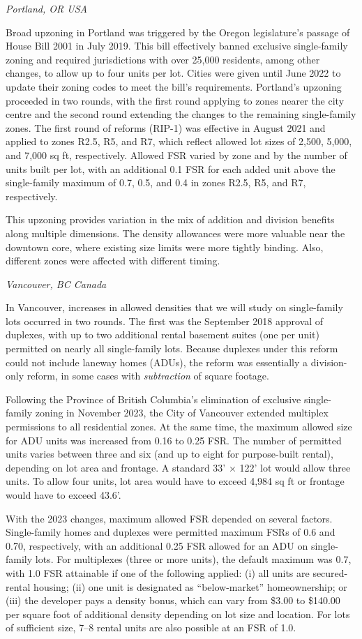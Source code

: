 \documentclass[12pt]{article}
\begin{document}
\textit{Portland, OR USA}

Broad upzoning in Portland was triggered by the Oregon legislature’s passage of
House Bill 2001 in July 2019. This bill effectively banned exclusive
single-family zoning and required jurisdictions with over 25,000 residents,
among other changes, to allow up to four units per lot. Cities were given until
June 2022 to update their zoning codes to meet the bill’s requirements.
Portland's upzoning proceeded in two rounds, with the first round applying to
zones nearer the city centre and the second round extending the changes to the
remaining single-family zones. The first round of reforms (RIP-1) was effective
in August 2021 and applied to zones R2.5, R5, and R7, which reflect allowed lot
sizes of 2,500, 5,000, and 7,000 sq ft, respectively. Allowed FSR varied by
zone and by the number of units built per lot, with an additional 0.1 FSR for
each added unit above the single-family maximum of 0.7, 0.5, and 0.4 in zones
R2.5, R5, and R7, respectively.

This upzoning provides variation in the mix of addition and division benefits
along multiple dimensions. The density allowances were more valuable near the
downtown core, where existing size limits were more tightly binding. Also,
different zones were affected with different timing.

\textit{Vancouver, BC Canada}

In Vancouver, increases in allowed densities that we will study on
single-family lots occurred in two rounds. The first was the September 2018
approval of duplexes, with up to two additional rental basement suites (one per
unit) permitted on nearly all single-family lots. Because duplexes under this
reform could not include laneway homes (ADUs), the reform was essentially a
division-only reform, in some cases with \emph{subtraction} of square footage.

Following the Province of British Columbia’s elimination of exclusive
single-family zoning in November 2023, the City of Vancouver extended multiplex
permissions to all residential zones. At the same time, the maximum allowed
size for ADU units was increased from 0.16 to 0.25 FSR. The number of permitted
units varies between three and six (and up to eight for purpose-built rental),
depending on lot area and frontage. A standard 33’ × 122’ lot would allow three
units. To allow four units, lot area would have to exceed 4,984 sq ft or
frontage would have to exceed 43.6’.

With the 2023 changes, maximum allowed FSR depended on several factors.
Single-family homes and duplexes were permitted maximum FSRs of 0.6 and 0.70,
respectively, with an additional 0.25 FSR allowed for an ADU on single-family
lots. For multiplexes (three or more units), the default maximum was 0.7, with
1.0 FSR attainable if one of the following applied: (i) all units are
secured-rental housing; (ii) one unit is designated as ``below-market''
homeownership; or (iii) the developer pays a density bonus, which can vary from
\$3.00 to \$140.00 per square foot of additional density depending on lot size
and location. For lots of sufficient size, 7–8 rental units are also possible
at an FSR of 1.0.
\end{document}
